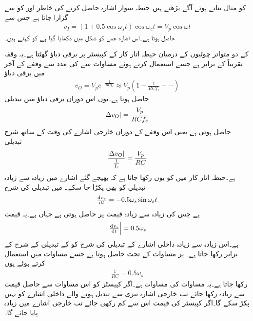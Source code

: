  کو مثال بناتے ہوئے آگے بڑھتے ہیں۔حیطہ سوار اشارہ حاصل کرنے کی خاطر  اور  کو  سے گزارا جاتا ہے جس سے 
\begin{align}\label{مساوات_ڈایوڈ_حیطہ_سوار_اشارہ}
v_I=\left(1+0.5 \cos \omega_s t \right) \cos \omega_c t=V_p \cos \omega t
\end{align}
حاصل ہوتا ہے۔اس اشارہ جس کو شکل  میں دکھایا گیا ہے کو   کہتے ہیں۔

 کے دو متواتر چوٹیوں کے درمیان حیطہ اتار کار کے  کپیسٹر پر برقی دباؤ گھٹتا ہے۔یہ وقفہ تقریباً  کے برابر ہے جسے استعمال کرتے ہوئے  مساوات  سے  کی مدد سے وقفے کے آخر میں برقی دباؤ
\begin{align}
v_O=V_{p} e^{-\frac{1}{RC f_c}} \approx V_p \left(1-\frac{1}{RC f_c} +\cdots \right )
\end{align}
حاصل ہوتا ہے۔یوں اس دوران برقی دباؤ میں تبدیلی
\begin{align*}
\abs{\Delta v_O} =\frac{V_p}{RC f_c}
\end{align*}
حاصل ہوتی ہے یعنی اس وقفے کے دوران خارجی اشارے کی وقت کے ساتھ شرح تبدیلی 
\begin{align}\label{مساوات_ڈایوڈ_حیطہ_اتار_کار_خارجی_اشارہ}
\frac{\abs{\Delta v_O}}{\frac{1}{f_c}} =\frac{V_p}{RC}
\end{align}
ہے۔حیطہ اتار کار میں  کو یوں رکھا جاتا ہے کہ  بھیجے گئے اشارے  میں زیادہ سے زیادہ تبدیلی کو بھی پکڑا جا سکے۔ میں تبدیلی کی شرح
\begin{align*}
\od{v_s}{t}=-0.5 \omega_s \sin \omega_s t
\end{align*}
ہے جس کی زیادہ سے زیادہ قیمت  پر حاصل ہوتی ہے جہاں  ہے۔یہ قیمت 
\begin{align*}
\abs{\od{v_s}{t}}=0.5 \omega_s 
\end{align*} 
ہے۔اس زیادہ سے زیادہ داخلی اشارے کے تبدیلی کی شرح کو  کے تبدیلی کے شرح کے برابر رکھا جاتا ہے۔ پر مساوات  کے تحت  حاصل ہوتا ہے جسے مساوات  میں استعمال کرتے ہوئے یوں
\begin{align}
\frac{1}{RC}=0.5 \omega_s
\end{align}
رکھا جاتا ہے۔یہ مساوات  کی مساوات ہے۔اگر کپیسٹر کو اس مساوات سے حاصل قیمت سے زیادہ رکھا جائے تب خارجی اشارہ تیزی سے تبدیل ہونے والے داخلی اشارے کو نہیں پکڑ سکے گا۔اگر کپیسٹر کی قیمت اس سے کم رکھی جائے تب خارجی اشارے میں  زیادہ پایا جائے گا۔ 

